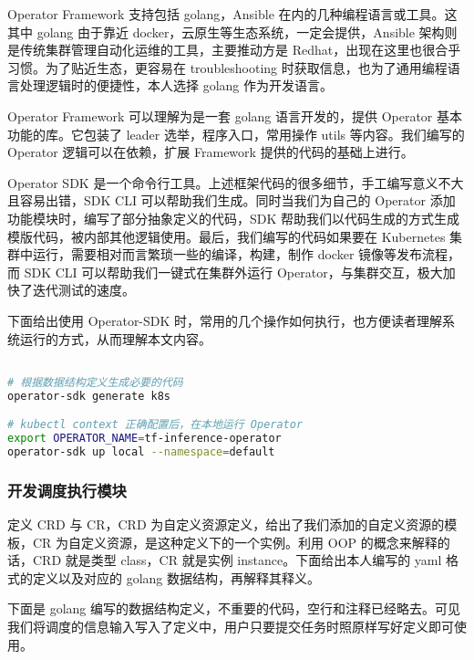 Operator Framework 支持包括 golang，Ansible 在内的几种编程语言或工具。这其中 golang 由于靠近 docker，云原生等生态系统，一定会提供，Ansible 架构则是传统集群管理自动化运维的工具，主要推动方是 Redhat，出现在这里也很合乎习惯。为了贴近生态，更容易在 troubleshooting 时获取信息，也为了通用编程语言处理逻辑时的便捷性，本人选择 golang 作为开发语言。

Operator Framework 可以理解为是一套 golang 语言开发的，提供 Operator 基本功能的库。它包装了 leader 选举，程序入口，常用操作 utils 等内容。我们编写的 Operator 逻辑可以在依赖，扩展 Framework 提供的代码的基础上进行。

Operator SDK 是一个命令行工具。上述框架代码的很多细节，手工编写意义不大且容易出错，SDK CLI 可以帮助我们生成。同时当我们为自己的 Operator 添加功能模块时，编写了部分抽象定义的代码，SDK 帮助我们以代码生成的方式生成模版代码，被内部其他逻辑使用。最后，我们编写的代码如果要在 Kubernetes 集群中运行，需要相对而言繁琐一些的编译，构建，制作 docker 镜像等发布流程，而 SDK CLI 可以帮助我们一键式在集群外运行 Operator，与集群交互，极大加快了迭代测试的速度。

下面给出使用 Operator-SDK 时，常用的几个操作如何执行，也方便读者理解系统运行的方式，从而理解本文内容。

\begin{lstlisting}[language=bash]

# 根据数据结构定义生成必要的代码
operator-sdk generate k8s

# kubectl context 正确配置后，在本地运行 Operator
export OPERATOR_NAME=tf-inference-operator
operator-sdk up local --namespace=default

\end{lstlisting}

\subsubsection{开发调度执行模块}

定义 CRD 与 CR，CRD 为自定义资源定义，给出了我们添加的自定义资源的模板，CR 为自定义资源，是这种定义下的一个实例。利用 OOP 的概念来解释的话，CRD 就是类型 class，CR 就是实例 instance。下面给出本人编写的 yaml 格式的定义以及对应的 golang 数据结构，再解释其释义。

下面是 golang 编写的数据结构定义，不重要的代码，空行和注释已经略去。可见我们将调度的信息输入写入了定义中，用户只要提交任务时照原样写好定义即可使用。

